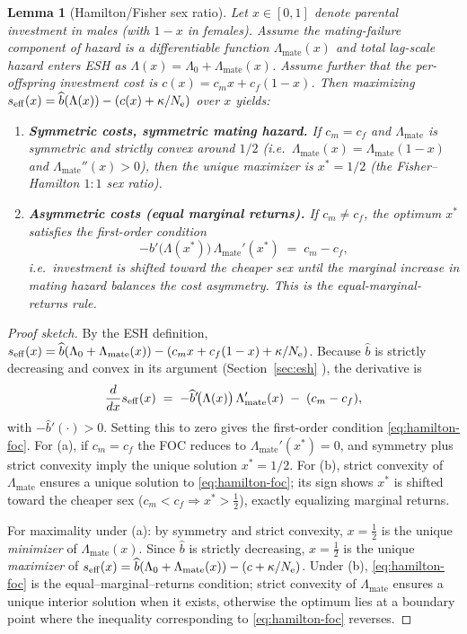 \documentclass[11pt]{article}
\theoremstyle{upright}
\newtheorem{lemma}{Lemma}
\newcommand{\Ne}{N_{\mathrm{e}}}
\newcommand{\seff}[1][]{s_{\mathrm{eff}\if\relax\detokenize{#1}\relax\else,#1\fi}}
\newcommand{\teq}{\mathrel{\!=\!}} %
\begin{document}
\begin{lemma}[Hamilton/Fisher sex ratio]\label{lem:hamilton}
Let $x\in[0,1]$ denote parental investment in males (with $1-x$ in females).
Assume the mating-failure component of hazard is a differentiable function
$\Lambda_{\mathrm{mate}}(x)$ and total lag-scale hazard enters ESH as
$\Lambda(x)=\Lambda_0+\Lambda_{\mathrm{mate}}(x)$.
Assume further that the per-offspring investment cost is $c(x)=c_m x + c_f(1-x)$.
Then maximizing $\seff(x)=\widehat{b}(\Lambda(x))-(c(x)+\kappa/\Ne)$ over $x$ yields:
\begin{enumerate}[label=(\alph*)]
\item \textbf{Symmetric costs, symmetric mating hazard.} If $c_m=c_f$ and
$\Lambda_{\mathrm{mate}}$ is symmetric and strictly convex around $1/2$
(i.e.\ $\Lambda_{\mathrm{mate}}(x)=\Lambda_{\mathrm{mate}}(1-x)$ and $\Lambda_{\mathrm{mate}}''(x)>0$),
then the unique maximizer is $x^{\ast}=1/2$ (the Fisher--Hamilton $1{:}1$ sex ratio).
\item \textbf{Asymmetric costs (equal marginal returns).} If $c_m\neq c_f$,
the optimum $x^{\ast}$ satisfies the first-order condition
\begin{equation}\label{eq:hamilton-foc}
-\widehat{b}'\!\big(\Lambda(x^{\ast})\big)\,\Lambda_{\mathrm{mate}}'(x^{\ast}) \;=\; c_m-c_f,
\end{equation}
i.e.\ investment is shifted toward the cheaper sex until the marginal increase in mating hazard
balances the cost asymmetry. This is the equal-marginal-returns rule.
\end{enumerate}
\end{lemma}

\begin{proof}[Proof sketch]
By the ESH definition, $\seff(x)=\widehat b(\Lambda_0+\Lambda_{\mathrm{mate}}(x))-(c_m x+c_f(1-x)+\kappa/\Ne)$.
Because $\widehat b$ is strictly decreasing and convex in its argument (Section~\ref{sec:esh} ),
the derivative is
\[
\frac{d}{dx}\seff(x)\;=\;-\widehat b'\!\big(\Lambda(x)\big)\,\Lambda_{\mathrm{mate}}'(x)\;-\;(c_m-c_f),
\]
with $-\widehat b'(\cdot)>0$. Setting this to zero gives the first-order condition \eqref{eq:hamilton-foc}.
For (a), if $c_m=c_f$ the FOC reduces to $\Lambda_{\mathrm{mate}}'(x^{\ast})=0$, and symmetry plus strict convexity
imply the unique solution $x^{\ast}=1/2$. For (b), strict convexity of $\Lambda_{\mathrm{mate}}$ ensures a unique
solution to \eqref{eq:hamilton-foc}; its sign shows $x^{\ast}$ is shifted toward the cheaper sex
($c_m<c_f\Rightarrow x^{\ast}>\tfrac12$), exactly equalizing marginal returns.

\noindent
For maximality under (a): by symmetry and strict convexity, $x\teq\tfrac12$ is the unique \emph{minimizer}
of $\Lambda_{\mathrm{mate}}(x)$. Since $\widehat b$ is strictly decreasing, $x\teq\tfrac12$ is the unique
\emph{maximizer} of $\seff(x)=\widehat b(\Lambda_0+\Lambda_{\mathrm{mate}}(x))-(c+\kappa/\Ne)$.
Under (b), \eqref{eq:hamilton-foc} is the equal–marginal–returns condition; strict convexity of
$\Lambda_{\mathrm{mate}}$ ensures a unique interior solution when it exists, otherwise the optimum
lies at a boundary point where the inequality corresponding to \eqref{eq:hamilton-foc} reverses.
\end{proof}
\end{document}
